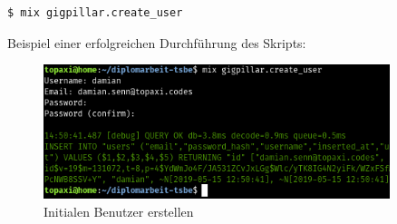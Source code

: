 \begin{lstlisting}[language=bash,frame=single]
$ mix gigpillar.create_user
\end{lstlisting}

\noindent{}Beispiel einer erfolgreichen Durchführung des Skripts:

\begin{figure}[!htb]
  \centering
  \includegraphics[width=0.9\textwidth]{einfuehrung/create-user.png}
  \caption{Initialen Benutzer erstellen}
\end{figure}
